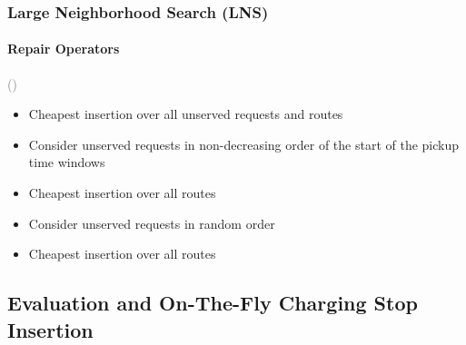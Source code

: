 \documentclass[aspectratio=1610]{beamer}
\let\oldfootnotesize\footnotesize
\renewcommand*{\footnotesize}{\oldfootnotesize\fontsize{6}{4}\selectfont}
\renewcommand{\footnotesize}{\scriptsize}
\begin{document}
\begin{frame}
  \frametitle{Large Neighborhood Search (LNS)}
  \framesubtitle{Repair Operators}
  
 {\footnotesize{\textcolor{gray}{(\cite{Ropke:2006})}}}
\begin{itemize}
	\item Cheapest insertion over all unserved requests and routes 
\end{itemize}

\medskip

\begin{itemize}
	\item Consider unserved requests in non-decreasing order of the start of the pickup time windows 
	\item Cheapest insertion over all routes 
\end{itemize}

\medskip

\begin{itemize}
	\item Consider unserved requests in random order
	\item Cheapest insertion over all routes 
\end{itemize}


\end{frame}


\subsection{Evaluation and On-The-Fly Charging Stop Insertion}
\end{document}
